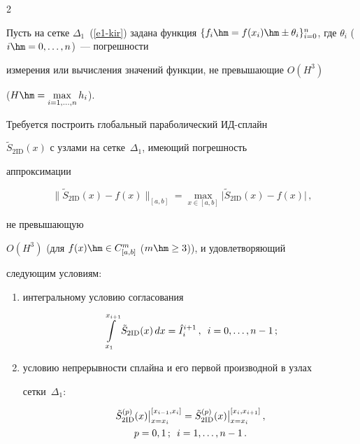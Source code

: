 \begin{multicols}{2}
  


  Пусть на сетке $\Delta_1$~(\ref{e1-kir}) задана функция $\{ f_i \hm= f(x_i) 


\hm\pm \theta_i\}^n_{i=0}$, где $\theta_i$ ($i\hm=0,\ldots ,n$)~--- погрешности 


измерения или вычисления значений функции, не превышающие $O(H^3)$ 


($H\hm= \max\limits_{i=1,\ldots ,n} h_i$). 


  


  Требуется построить глобальный параболический ИД-сплайн 


$\tilde{S}_{2\mathrm{ID}}(x)$ с узлами на сетке~$\Delta_1$, имеющий погрешность 


аппроксимации 


$$


\parallel \!\tilde{S}_{2\mathrm{ID}}(x)- f(x)\!\parallel_{[a,b]} = 


\max\limits_{x\in[a,b]} \vert \tilde{S}_{2\mathrm{ID}}(x)- f(x)\vert\,,


$$ 


не превышающую 


$O(H^3)$ (для $f(x)\hm\in C^m_{[a,b]}$ ($m\hm\geq 3$)), и удовлетворяющий 


следующим условиям:


  \begin{enumerate}[(1)]


\item интегральному условию согласования 


\begin{equation}


\int\limits_{x_1}^{x_{i+1}} \tilde{S}_{2\mathrm{ID}}(x)\,dx =\hat{I}_i^{i+1}\,,\enskip 


i=0,\ldots , n-1\,;


\label{e9-kir}


\end{equation}


\item условию непрерывности сплайна и его первой производной в узлах 


сетки~$\Delta_1$:


\begin{multline}


\tilde{S}_{2\mathrm{ID}}^{(p)}(x) \big\vert_{x=x_i}^{[x_{i-1},x_i]}=\tilde{S}_{2\mathrm{ID}}^{(p)} 


(x)\big\vert_{x=x_i}^{[x_i,x_{i+1}]}\,,\\  p=0,1\,; \enskip i=1,\ldots ,n-1\,.



\end{multline}
\end{enumerate}
\end{multicols}
